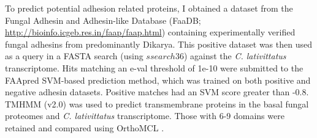 \indent To predict potential adhesion related proteins, I obtained a dataset from the Fungal Adhesin and Adhesin-like Database (FaaDB; \url{http://bioinfo.icgeb.res.in/faap/faap.html}) containing experimentally verified fungal adhesins from predominantly Dikarya. This positive dataset was then used as a query in a FASTA search (using $ssearch36$) against the \textit{C. lativittatus} transcriptome. Hits matching an e-val threshold of 1e-10 were submitted to the FAApred SVM-based prediction method, which was trained on both positive and negative adhesin datasets. Positive matches had an SVM score greater than -0.8.\\
\indent TMHMM (v2.0) \cite{Krogh2001} was used to predict transmembrane proteins in the basal fungal proteomes and \textit{C. lativittatus} transcriptome. Those with 6-9 domains were retained and compared using OrthoMCL \cite{Li2003}. \\

